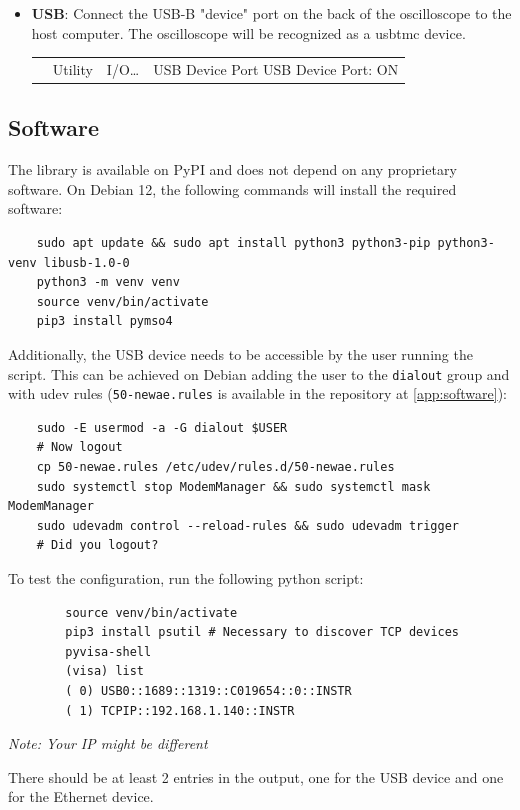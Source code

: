 \documentclass[a4paper,english,twoside,10pt]{article}
\newenvironment{scopesetting}{
	\parskip=5pt\par\nopagebreak\centering\sffamily%
	\begin{tabular}{>{\columncolor{cyan!15}}m{2em} >{\columncolor{cyan!15}}m{.8\textwidth}}
	 & 
} {
	\\
	\end{tabular}
	\par\noindent\ignorespacesafterend%
}
\begin{document}
\begin{itemize}
	\item \textbf{USB}: Connect the USB-B "device" port on the back of the oscilloscope to the host computer. The oscilloscope will be recognized as a \gls{usbtmc} device.
	\begin{scopesetting}
		Utility\ \rightarrow\  I/O\ldots\ \rightarrow\  USB Device Port\newline
		USB Device Port: ON
	\end{scopesetting}
\end{itemize}

\subsection{Software}
The library is available on PyPI and does not depend on any proprietary software. On Debian 12, the following commands will install the required software:
\begin{verbatim}
	sudo apt update && sudo apt install python3 python3-pip python3-venv libusb-1.0-0
	python3 -m venv venv
	source venv/bin/activate
	pip3 install pymso4
\end{verbatim}
Additionally, the USB device needs to be accessible by the user running the script. This can be achieved on Debian adding the user to the \texttt{dialout} group and with udev rules (\texttt{50-newae.rules} is available in the repository at \autoref{app:software}):
\begin{verbatim}
	sudo -E usermod -a -G dialout $USER
	# Now logout
	cp 50-newae.rules /etc/udev/rules.d/50-newae.rules
	sudo systemctl stop ModemManager && sudo systemctl mask ModemManager
	sudo udevadm control --reload-rules && sudo udevadm trigger
	# Did you logout?
\end{verbatim}
To test the configuration, run the following python script:
\begin{flushleft}
	\captionsetup{type=listing}
	\begin{verbatim}
		source venv/bin/activate
		pip3 install psutil # Necessary to discover TCP devices
		pyvisa-shell
		(visa) list
		( 0) USB0::1689::1319::C019654::0::INSTR
		( 1) TCPIP::192.168.1.140::INSTR
	\end{verbatim}
	\caption{\textit{Note: Your IP might be different}}
\end{flushleft}
There should be at least 2 entries in the output, one for the USB device and one for the Ethernet device.
\end{document}
